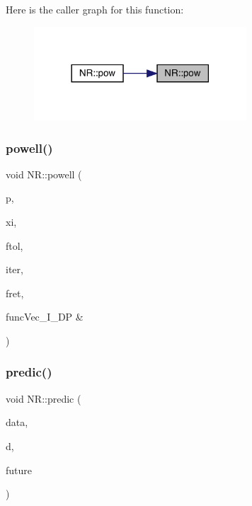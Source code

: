 Here is the caller graph for this function\+:
\nopagebreak
\begin{figure}[H]
\begin{center}
\leavevmode
\includegraphics[width=225pt]{da/d46/namespaceNR_a7d26b090a44a3b527619df12b89923c9_icgraph}
\end{center}
\end{figure}
\mbox{\label{namespaceNR_a4fb8d09f0f222a20c3ff734627a5a760}} 
\subsubsection{\texorpdfstring{powell()}{powell()}}
{\footnotesize\ttfamily void N\+R\+::powell (\begin{DoxyParamCaption}\item[{\mbox{\hyperlink{namespaceNR_ab293e06a6bf799d8a7ed932b6852bcb8}{Vec\+\_\+\+I\+O\+\_\+\+DP}} \&}]{p,  }\item[{\mbox{\hyperlink{namespaceNR_ad1513aa4697878ed3bff0b8b3c9dd910}{Mat\+\_\+\+I\+O\+\_\+\+DP}} \&}]{xi,  }\item[{const \mbox{\hyperlink{namespaceNR_af6ff762dd605ff477b8e52387253a02a}{DP}}}]{ftol,  }\item[{int \&}]{iter,  }\item[{\mbox{\hyperlink{namespaceNR_af6ff762dd605ff477b8e52387253a02a}{DP}} \&}]{fret,  }\item[{\mbox{\hyperlink{namespaceNR_af6ff762dd605ff477b8e52387253a02a}{DP}} }]{funcVec\+\_\+\+I\+\_\+\+D\+P \& }\end{DoxyParamCaption})}

\mbox{\label{namespaceNR_a1e509a4abc2af770058b8ec1037f37ad}} 
\subsubsection{\texorpdfstring{predic()}{predic()}}
{\footnotesize\ttfamily void N\+R\+::predic (\begin{DoxyParamCaption}\item[{\mbox{\hyperlink{namespaceNR_a9f943da53862537c552e2a770cb170ae}{Vec\+\_\+\+I\+\_\+\+DP}} \&}]{data,  }\item[{\mbox{\hyperlink{namespaceNR_a9f943da53862537c552e2a770cb170ae}{Vec\+\_\+\+I\+\_\+\+DP}} \&}]{d,  }\item[{\mbox{\hyperlink{namespaceNR_a970094d23441f8ef6a45282a7eb2103d}{Vec\+\_\+\+O\+\_\+\+DP}} \&}]{future }\end{DoxyParamCaption})}

